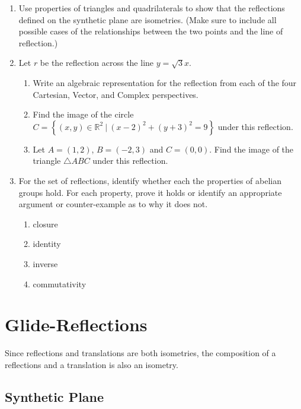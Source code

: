 \documentclass[
]{book}
\providecommand{\tightlist}{%
  \setlength{\itemsep}{0pt}\setlength{\parskip}{0pt}}
\theoremstyle{definition}
\theoremstyle{definition}
\theoremstyle{definition}
\theoremstyle{definition}
\theoremstyle{remark}
\begin{document}
\begin{enumerate}
\def\labelenumi{\arabic{enumi}.}
\item
  Use properties of triangles and quadrilaterals to show that the reflections defined on the synthetic plane are isometries. (Make sure to include all possible cases of the relationships between the two points and the line of reflection.)
\item
  Let \(r\) be the reflection across the line \(y=\sqrt{3}x\).

  \begin{enumerate}
  \def\labelenumii{\alph{enumii}.}
  \tightlist
  \item
    Write an algebraic representation for the reflection from each of the four Cartesian, Vector, and Complex perspectives.
  \item
    Find the image of the circle \(C=\left\{ (x,y)\in \mathbb{R}^2 \: \vert \: (x-2)^2+(y+3)^2 =9\right\}\) under this reflection.
  \item
    Let \(A=(1,2)\), \(B=(-2,3)\) and \(C=(0,0)\). Find the image of the triangle \(\triangle ABC\) under this reflection.
  \end{enumerate}
\item
  For the set of reflections, identify whether each the properties of abelian groups hold. For each property, prove it holds or identify an appropriate argument or counter-example as to why it does not.

  \begin{enumerate}
  \def\labelenumii{\alph{enumii}.}
  \tightlist
  \item
    closure
  \item
    identity
  \item
    inverse
  \item
    commutativity
  \end{enumerate}
\end{enumerate}

\hypertarget{glide-reflections}{%
\section{Glide-Reflections}\label{glide-reflections}}

Since reflections and translations are both isometries, the composition of a reflections and a translation is also an isometry.

\hypertarget{synthetic-plane-4}{%
\subsection{Synthetic Plane}\label{synthetic-plane-4}}
\end{document}
